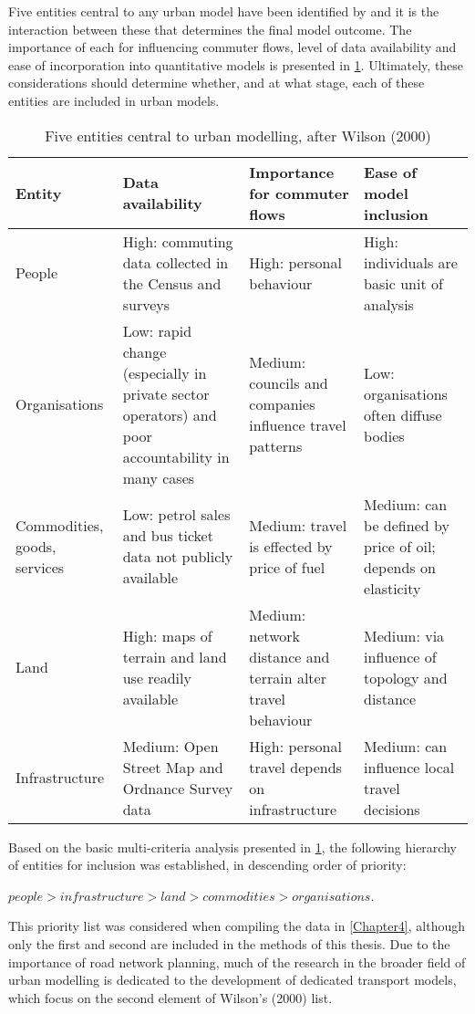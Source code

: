 Five entities central to any urban model have been identified
by \citet{wilson2000complex} and
it is the interaction between these that determines
the final model outcome. The importance of each
for influencing commuter flows, level of data availability and
ease of incorporation into quantitative models is presented in
\cref{t:entities}. Ultimately, these considerations should determine
whether, and at what stage, each of these entities are included in urban models.
\begin{table}[htbp]
\caption{Five entities central to urban modelling, after Wilson (2000)}
\begin{tabular}{p{2cm}p{3.5cm}p{3.5cm}p{3.5cm}} \toprule
Entity & Data availability & Importance for commuter flows & Ease of model inclusion \\ \midrule
People & High: commuting data collected in the Census and surveys & High: personal behaviour & High: individuals are basic unit of analysis \\
Organisations & Low: rapid change (especially in private sector operators) and poor accountability in many cases & Medium: councils and companies influence travel patterns & Low: organisations often
diffuse bodies \\
Commodities, goods, services & Low: petrol sales and bus ticket data not publicly available & Medium: travel is effected by price of fuel & Medium: can be defined by price of oil; depends on
elasticity \\
Land & High: maps of terrain and land use readily available & Medium: network distance and terrain alter travel behaviour & Medium: via influence of topology and distance \\
Infrastructure & Medium: Open Street Map and Ordnance Survey data & High: personal travel depends on infrastructure & Medium: can influence local travel decisions \\
\bottomrule
\end{tabular}
\label{t:entities}
\end{table}
Based on the basic multi-criteria analysis presented in
\cref{t:entities}, the following
hierarchy of entities for inclusion was established, in descending
order of priority:

$people > infrastructure > land > commodities > organisations$.

This priority list was considered when 
compiling the data in \cref{Chapter4},
although only the first and second are
included in the methods of this thesis. Due to the importance of road network
planning, much of the research in the broader field of urban modelling is
dedicated to the development of dedicated transport models, which focus on
the second element of Wilson's (2000) list.

